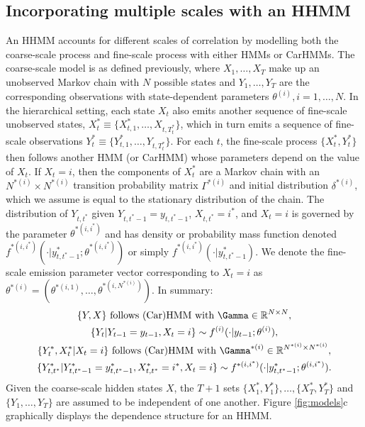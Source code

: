 \subsection{Incorporating multiple scales with an HHMM}

An HHMM accounts for different scales of correlation by modelling both the coarse-scale process and fine-scale process with either HMMs \citep{Barajas:2017,Adam:2019} or CarHMMs. The coarse-scale model is as defined previously, where $X_1, \ldots, X_T$ make up an unobserved Markov chain with $N$ possible states and $Y_1,\ldots, Y_T$ are the corresponding observations with state-dependent parameters $\theta^{(i)}, i = 1,\ldots,N$.   
%
In the hierarchical setting, each state $X_t$ also emits another sequence of fine-scale unobserved states, $X_t^* \equiv \{X_{t,1}^*,\ldots, X_{t,T_t^*}\}$, which in turn emits a sequence of fine-scale observations $Y_t^* \equiv \{Y_{t,1}^*,\ldots, Y_{t,T_t^*}\}$. For each $t$, the fine-scale process $\{X_t^*, Y_t^*\}$ then follows another HMM (or CarHMM) whose parameters depend on the value of $X_t$. If $X_t = i$, then the components of $X_t^*$ are a Markov chain with an $N^{*(i)} \times N^{*(i)}$ transition probability matrix $\Gamma^{*(i)}$ and initial distribution $\delta^{*(i)}$, which we assume is equal to the stationary distribution of the chain. The distribution of $Y_{t,t^*}$ given $Y_{t,t^*-1} = y_{t,t^*-1}$, $X_{t,t^*}=i^*$, and $X_t=i$ is governed by the parameter $\theta^{*(i,i^*)}$ and has density or probability mass function denoted $f^{*(i,i^*)}\left(\cdot|y^*_{t,t^*-1}; \theta^{*(i,i^*)}\right)$ or simply $f^{*(i,i^*)}(\cdot|y^*_{t,t^*-1})$. We denote the fine-scale emission parameter vector corresponding to $X_t=i$ as $\theta^{*(i)}=\left(\theta^{*(i,1)}, \ldots, \theta^{*(i,N^{*(i)})}\right)$. In summary:
%
%
\begin{gather*}
    \{Y, X\} \text{ follows (Car)HMM with } \Gamma \in \bbR^{N \times N}, \\
    \{Y_t   | Y_{t-1} = y_{t-1}, X_t = i\} \sim f^{(i)}(\cdot|y_{t-1};\theta^{(i)}), \\
    \{Y^*_t,X^*_t | X_t = i\} \text{ follows (Car)HMM with } \Gamma^{*(i)} \in \bbR^{N^{*(i)} \times N^{*(i)}}, \\
    \{Y^*_{t,t^*} | Y^*_{t,t^*-1} = y^*_{t,t^*-1}, X^*_{t,t^*} = i^*, X_t = i\} \sim f^{*(i,i^*)}(\cdot|y^{*}_{t,t^*-1};\theta^{(i,i^*)}).
\end{gather*}
Given the coarse-scale hidden states $X$, the $T+1$ sets $\{X_1^*, Y_1^*\}, \ldots, \{X_T^*, Y_T^*\}$ and $\{Y_1,\ldots,Y_T\}$ are assumed to be independent of one another. Figure \ref{fig:models}c graphically displays the dependence structure for an HHMM.
%
%

